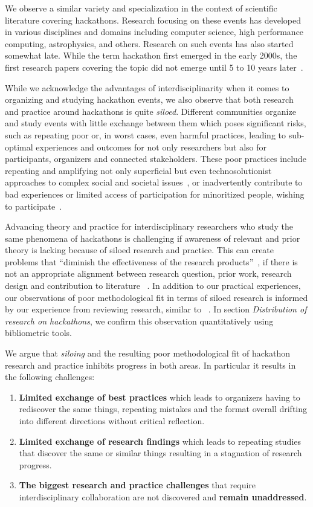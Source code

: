 \documentclass{ieeeaccess}
\begin{document}
We observe a similar variety and specialization in the context of scientific literature covering hackathons. 
Research focusing on these events has developed in various disciplines and domains including computer science, high performance computing, astrophysics, and others. 
Research on such events has also started somewhat late. 
While the term hackathon first emerged in the early 2000s, the first research papers covering the topic did not emerge until 5 to 10 years later~\cite{falk202010}.

While we acknowledge the advantages of interdisciplinarity when it comes to organizing and studying hackathon events, we also observe that both research and practice around hackathons is quite \textit{siloed}. 
Different communities organize and study events with little exchange between them which poses significant risks, such as repeating poor or, in worst cases, even harmful practices, leading to sub-optimal experiences and outcomes for not only researchers but also for participants, organizers and connected stakeholders.
These poor practices include repeating and amplifying not only superficial but even technosolutionist approaches to complex social and societal issues~\cite{falk2021hackathons}, or inadvertently contribute to bad experiences or limited access of participation for minoritized people, wishing to participate~\cite{paganini2020}.

Advancing theory and practice for interdisciplinary researchers who study the same phenomena of hackathons is challenging if awareness of relevant and prior theory is lacking because of siloed research and practice. 
This can create problems that ``diminish the effectiveness of the research products''~\cite{edmondson2007methodological}, if there is not an appropriate alignment between research question, prior work, research design and contribution to literature ~\cite{edmondson2007methodological}.
In addition to our practical experiences, our observations of poor methodological fit in terms of siloed research is informed by our experience from reviewing research, similar to ~\cite{edmondson2007methodological}.
In section \textit{Distribution of research on hackathons}, we confirm this observation quantitatively using bibliometric tools.

We argue that \textit{siloing} and the resulting poor methodological fit of hackathon research and practice inhibits progress in both areas. 
In particular it results in the following challenges:
\begin{enumerate}
    \item \textbf{Limited exchange of best practices} which leads to organizers having to rediscover the same things, repeating mistakes and the format overall drifting into different directions without critical reflection.
    \item \textbf{Limited exchange of research findings} which leads to repeating studies that discover the same or similar things resulting in a stagnation of research progress.
    \item \textbf{The biggest research and practice challenges} that require interdisciplinary collaboration are not discovered and \textbf{remain unaddressed}.
\end{enumerate}
\end{document}

